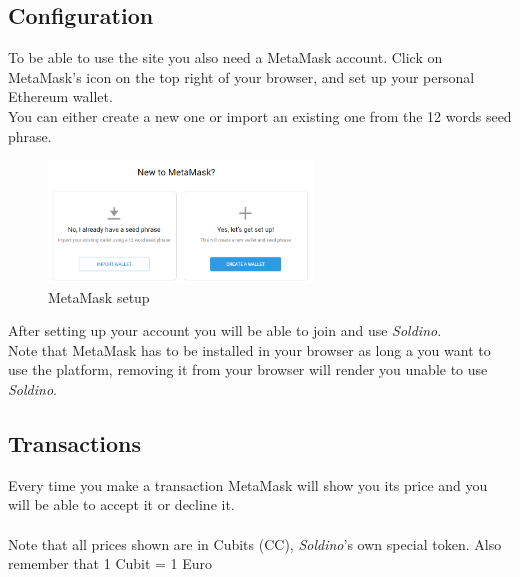 	\subsection{Configuration}
	To be able to use the site you also need a MetaMask account. Click on 
	MetaMask's icon on the top right of your browser, and set up your 
	personal Ethereum wallet.\\
	You can either create a new one or import an existing one from the 12 
	words seed phrase.
	\begin{figure}[H]
		\includegraphics[width=7cm]{res/images/metamask_select.png}
		\centering
		\caption{MetaMask setup}
	\end{figure}
	\noindent After setting up your account you will be able to join and use 
	\textit{Soldino}.
	\newline \\
	Note that MetaMask has to be installed in your browser as long a you want 
	to use the platform, removing it from your browser will render you unable to
	use \textit{Soldino}.
	\subsection{Transactions}
	Every time you make a transaction MetaMask will show you its price and you 
	will be able to accept it or decline it.\\ \\
	Note that all prices shown are in Cubits (CC), \textit{Soldino}'s own special token. 
	Also remember that 1 Cubit = 1 Euro
	
	
	
	